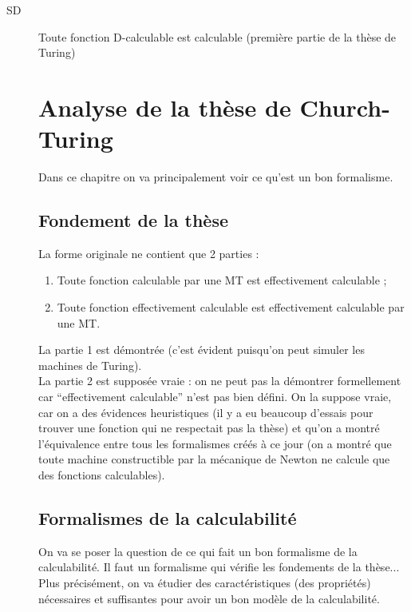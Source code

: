 \begin{description}
	\item[SD]  Toute fonction D-calculable est calculable (première partie
		de la thèse de Turing)

\chapter{Analyse de la thèse de Church-Turing}
\label{sec:analyse_de_la_th_se_de_church_turing}
Dans ce chapitre on va principalement voir ce qu'est un bon formalisme.

\section{Fondement de la thèse}
\label{sub:fondement_de_la_th_se}
\begin{mythese}
La forme originale ne contient que 2 parties :
\begin{enumerate}
	\item Toute fonction calculable par une MT est effectivement calculable ;
	\item Toute fonction effectivement calculable est effectivement calculable par une MT.
\end{enumerate}
\end{mythese}

La partie 1 est démontrée (c'est évident puisqu'on peut simuler les machines de Turing).\\

La partie 2 est supposée vraie : on ne peut pas la démontrer formellement car ``effectivement calculable'' n'est pas bien défini. On la suppose vraie, car on a des évidences heuristiques (il y a eu beaucoup d'essais pour trouver une fonction qui ne respectait pas la thèse) et qu'on a montré l'équivalence entre tous les formalismes créés à ce jour (on a montré que toute machine constructible par la mécanique de Newton ne calcule que des fonctions calculables).

\section{Formalismes de la calculabilité}
\label{sub:formalismes_de_la_calculabilit_}
On va se poser la question de ce qui fait un bon formalisme de la calculabilité. Il faut un formalisme qui vérifie les fondements de la thèse... Plus précisément, on va étudier des caractéristiques (des propriétés) nécessaires et suffisantes pour avoir un bon modèle de la calculabilité.


\end{description}
